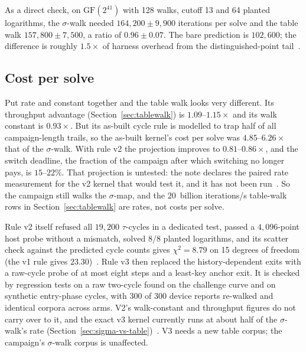 As a direct check, on $\mathrm{GF}(2^{41})$ with 128 walks, cutoff 13
and 64 planted logarithms, the $\sigma$-walk needed
$164{,}200\pm9{,}900$ iterations per solve and the table walk
$157{,}800\pm7{,}500$, a ratio of $0.96\pm0.07$. The bare prediction is
$102{,}600$; the difference is roughly $1.5\times$ of harness overhead
from the distinguished-point tail~.

\subsection{Cost per solve}
\label{sec:walk-cycles}

Put rate and constant together and the table walk looks very
different. Its throughput advantage (Section~\ref{sec:tablewalk}) is
$1.09$--$1.15\times$ and its walk constant is $0.93\times$. But its
as-built cycle rule is modelled to trap half of all campaign-length
trails, so the as-built kernel's cost per solve was $4.85$--$6.26\times$
that of the $\sigma$-walk. With rule v2 the projection improves to
$0.81$--$0.86\times$, and the switch deadline, the fraction of the
campaign after which switching no longer pays, is $15$--$22\%$. That
projection is untested: the note declares the paired rate measurement
for the v2 kernel that would test it, and it has not been
run~. So the campaign still walks
the $\sigma$-map, and the $20$~billion iterations/s table-walk rows in
Section~\ref{sec:tablewalk} are rates, not costs per solve.

Rule v2 itself refused all $19{,}200$ $\tau$-cycles in a dedicated
test, passed a $4{,}096$-point host probe without a mismatch, solved
$8/8$ planted logarithms, and its scatter check against the predicted
cycle counts gives $\chi^2=8.79$ on 15 degrees of freedom (the v1 rule
gives $23.30$)~. Rule
v3 then replaced the history-dependent exits with a raw-cycle probe of
at most eight steps and a least-key anchor exit. It is checked by
regression tests on a raw two-cycle found on the challenge curve and
on synthetic entry-phase cycles, with $300$ of $300$ device reports
re-walked and identical corpora across arms. V2's walk-constant and
throughput figures do not carry over to it, and the exact v3 kernel
currently runs at about half of the $\sigma$-walk's rate
(Section~\ref{sec:sigma-vs-table})~.
V3 needs a new table corpus; the campaign's $\sigma$-walk corpus is
unaffected.
